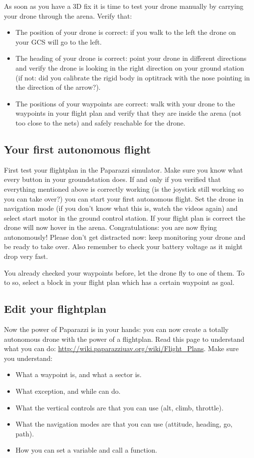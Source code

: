 \documentclass{article}
\begin{document}
As soon as you have a 3D fix it is time to test your drone manually by carrying your drone through the arena. Verify that:
\begin{itemize}
\item The position of your drone is correct: if you walk to the left the drone on your GCS will go to the left.
\item The heading of your drone is correct: point your drone in different directions and verify the drone is looking in the right direction on your ground station (if not: did you calibrate the rigid body in optitrack with the nose pointing in the direction of the arrow?). 
\item The positions of your waypoints are correct: walk with your drone to the waypoints in your flight plan and verify that they are inside the arena (not too close to the nets) and safely reachable for the drone. 
\end{itemize}

\subsection*{Your first autonomous flight}
First test your flightplan in the Paparazzi simulator. Make sure you know what every button in your groundstation does.
If and only if you verified that everything mentioned above is correctly working (is the joystick still working so you can take over?) you can start your first autonomous flight. 
Set the drone in navigation mode (if you don't know what this is, watch the videos again) and select start motor in the ground control station. If your flight plan is correct the drone will now hover in the arena. Congratulations: you are now flying autonomously! Please don't get distracted now: keep monitoring your drone and be ready to take over. Also remember to check your battery voltage as it might drop very fast. 

You already checked your waypoints before, let the drone fly to one of them. To to so, select a block in your flight plan which has a certain waypoint as goal. 
\subsection*{Edit your flightplan}
Now the power of Paparazzi is in your hands: you can now create a totally autonomous drone with the power of a flightplan. Read this page to understand what you can do: \url{http://wiki.paparazziuav.org/wiki/Flight_Plans}. 
Make sure you understand:
\begin{itemize}
	\item What a waypoint is, and what a sector is. 
	\item What exception, and while can do. 
	\item What the vertical controls are that you can use (alt, climb, throttle).
	\item What the navigation modes are that you can use (attitude, heading, go, path). 
	\item How you can set a variable and call a function. 
\end{itemize}
\end{document}
